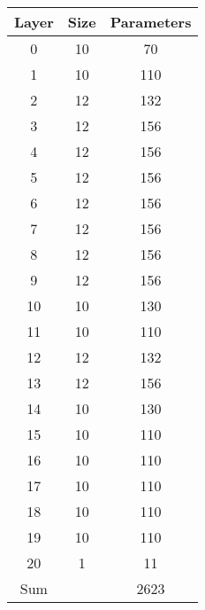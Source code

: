 \begin{tabular}{|c|c|c|}
\hline
Layer&Size&Parameters\\ 
\hline

0 & 10 & 70\\ 
\hline
1 & 10 & 110\\ 
\hline
2 & 12 & 132\\ 
\hline
3 & 12 & 156\\ 
\hline
4 & 12 & 156\\ 
\hline
5 & 12 & 156\\ 
\hline
6 & 12 & 156\\ 
\hline
7 & 12 & 156\\ 
\hline
8 & 12 & 156\\ 
\hline
9 & 12 & 156\\ 
\hline
10 & 10 & 130\\ 
\hline
11 & 10 & 110\\ 
\hline
12 & 12 & 132\\ 
\hline
13 & 12 & 156\\ 
\hline
14 & 10 & 130\\ 
\hline
15 & 10 & 110\\ 
\hline
16 & 10 & 110\\ 
\hline
17 & 10 & 110\\ 
\hline
18 & 10 & 110\\ 
\hline
19 & 10 & 110\\ 
\hline
20 & 1 & 11\\ 
\hline
Sum &  & 2623\\ 
\hline
\end{tabular}

